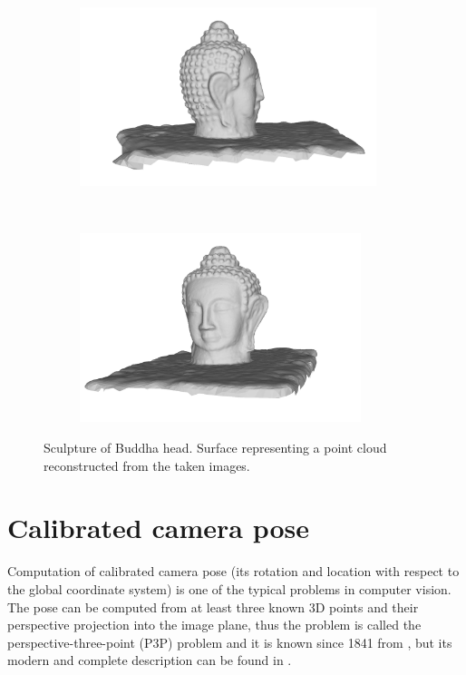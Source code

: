 \begin{figure}[ht]
  \centering
  \begin{subfigure}[b]{0.45\textwidth}
    \includegraphics[width=0.95\textwidth]{images/LADIO_01.png}
    \vspace{2mm}
  \end{subfigure}
  ~
  \begin{subfigure}[b]{0.45\textwidth}
    \includegraphics[width=0.90\textwidth]{images/LADIO_02.png}
  \end{subfigure}
  \caption{Sculpture of Buddha head. Surface representing a point cloud reconstructed from the taken images.}
\end{figure}

\section{Calibrated camera pose}
Computation of calibrated camera pose (its rotation and location with respect to the global coordinate system) is one of the typical problems in computer vision.
The pose can be computed from at least three known 3D points and their perspective projection into the image plane, thus the problem is called the perspective-three-point (P3P) problem and it is known since 1841 from \cite{p3p1841}, but its modern and complete description can be found in \cite{P3P}.

